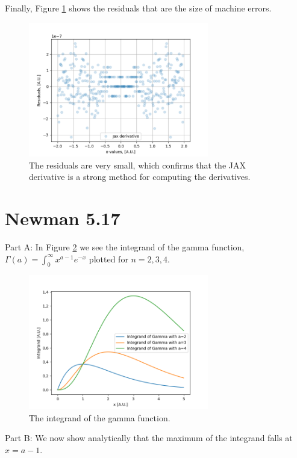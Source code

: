 \documentclass[11pt]{article}
\begin{document}
Finally, Figure \ref{resid} shows the residuals that are the size of machine errors.

\begin{figure}[!htbp]
    \centering
    \includegraphics[width=0.7\textwidth]{Jax_res.png}
    \caption{The residuals are very small, which confirms that the JAX derivative is a strong method for computing the derivatives.}
    \label{resid}
\end{figure}

\section{Newman 5.17}


Part A: In Figure \ref{integrand} we see the integrand of the gamma function, $\Gamma(a)=\int_{0}^{\infty}x^{a-1}e^{-x}$ plotted for $n=2,3,4$.

\begin{figure}[!htbp]
    \centering
    \includegraphics[width=0.7\textwidth]{integrand_plot.png}
    \caption{The integrand of the gamma function.}
    \label{integrand}
\end{figure}


Part B: 
We now show analytically that the maximum of the integrand falls at $x=a-1$. 
\end{document}
